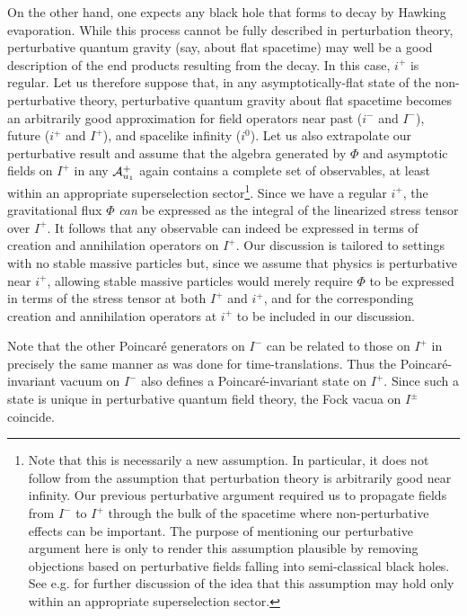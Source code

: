 \documentclass[12pt,onecolumn,eqsecnum,aps,prd,nofootinbib]{revtex4}
\begin{document}
On the other hand, one expects any black hole
that forms to decay by Hawking evaporation.  While this process cannot be fully described in perturbation theory,  perturbative quantum gravity (say, about flat spacetime) may well be a good description of the end products resulting from the decay.  In this case,  $i^+$ is regular. Let
us therefore suppose that, in any asymptotically-flat state of the non-perturbative
theory, perturbative quantum gravity about flat spacetime becomes an
arbitrarily good approximation for field operators near
past ($i^-$ and $I^-$), future ($i^+$ and $I^+$), and spacelike
infinity ($i^0$).   Let us also extrapolate our perturbative result and assume that the algebra generated by $\Phi$ and asymptotic fields on $I^+$ in any ${\cal A}^+_{u_1}$ again contains a complete set of observables, at least within an appropriate superselection sector\footnote{Note that this is necessarily a new assumption.  In particular, it does not follow from the assumption that perturbation theory is arbitrarily good near infinity.  Our previous perturbative argument required us to propagate fields from $I^-$ to $I^+$ through the bulk of the spacetime where non-perturbative effects can be important.  The purpose of mentioning our perturbative argument here is only to render this assumption plausible by removing objections based on perturbative fields falling into semi-classical black holes.  See e.g. \cite{BadH} for further discussion of the idea that this assumption may hold only within an appropriate superselection sector.}. Since we have a regular $i^+$, the gravitational flux  $\Phi$ {\em can} be
expressed as the integral of the linearized stress tensor over
$I^+$. It follows that any observable can indeed be expressed in
terms of creation and annihilation operators on $I^+$.  Our discussion is tailored to settings with no stable massive particles but, since we assume that physics is perturbative near $i^+$, allowing stable massive particles would merely require $\Phi$ to be expressed in terms of the stress tensor at both $I^+$ and $i^+$, and for the corresponding creation and annihilation operators at $i^+$ to be included in our discussion.

Note that the other Poincar\'e generators on $I^-$ can be related to
those on $I^+$ in precisely the same manner as was done for
time-translations.  Thus the Poincar\'e-invariant vacuum on $I^-$
also defines a Poincar\'e-invariant state on $I^+$.  Since such a
state is unique in perturbative quantum field theory,
the Fock vacua on $I^\pm$ coincide.
\end{document}
